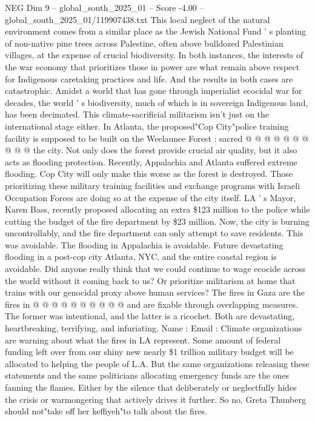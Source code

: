 \begin{textsample}{NEG Dim 9 – global\_south\_2025\_01 – Score -4.00 – global\_south\_2025\_01/119907438.txt}
This local neglect of the natural environment comes from a similar place as the Jewish National Fund ' s planting of non-native pine trees across Palestine, often above bulldozed Palestinian villages, at the expense of crucial biodiversity.
In both instances, the interests of the war economy that prioritizes those in power are what remain above respect for Indigenous caretaking practices and life.
And the results in both cases are catastrophic.
Amidst a world that has gone through imperialist ecocidal war for decades, the world ' s biodiversity, much of which is in sovereign Indigenous land, has been decimated.
This climate-sacrificial militarism isn't just on the international stage either.
In Atlanta, the proposed"Cop City"police training facility is supposed to be built on the Weelaunee Forest : sacred @ @ @ @ @ @ @ @ @ @ the city.
Not only does the forest provide crucial air quality, but it also acts as flooding protection.
Recently, Appalachia and Atlanta suffered extreme flooding.
Cop City will only make this worse as the forest is destroyed.
Those prioritizing these military training facilities and exchange programs with Israeli Occupation Forces are doing so at the expense of the city itself.
LA ' s Mayor, Karen Bass, recently proposed allocating an extra \$123 million to the police while cutting the budget of the fire department by \$23 million.
Now, the city is burning uncontrollably, and the fire department can only attempt to save residents.
This was avoidable.
The flooding in Appalachia is avoidable.
Future devastating flooding in a post-cop city Atlanta, NYC, and the entire coastal region is avoidable.
Did anyone really think that we could continue to wage ecocide across the world without it coming back to us?
Or prioritize militarism at home that trains with our genocidal proxy above human services?
The fires in Gaza are the fires in @ @ @ @ @ @ @ @ @ @ and are fixable through overlapping measures.
The former was intentional, and the latter is a ricochet.
Both are devastating, heartbreaking, terrifying, and infuriating.
Name : Email : Climate organizations are warning about what the fires in LA represent.
Some amount of federal funding left over from our shiny new nearly \$1 trillion military budget will be allocated to helping the people of L.A.
But the same organizations releasing these statements and the same politicians allocating emergency funds are the ones fanning the flames.
Either by the silence that deliberately or neglectfully hides the crisis or warmongering that actively drives it further.
So no, Greta Thunberg should not"take off her keffiyeh"to talk about the fires.

\end{textsample}
